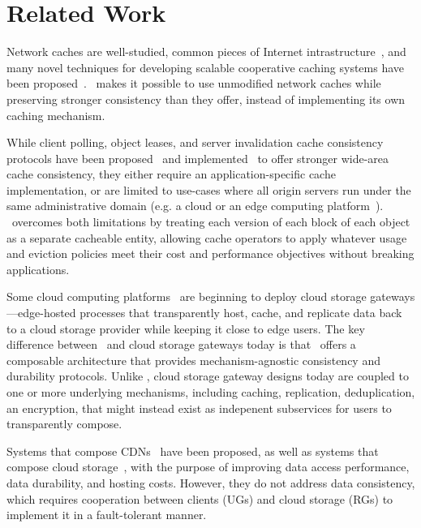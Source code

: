 \section{Related Work}
\label{sec:related}

Network caches are well-studied, common pieces of Internet intrastructure~\cite{wang99-survey,podlipnig03-survey,raunak99,Androutsellis-Theotokis04,shim99}, and many novel techniques for developing scalable cooperative caching systems have been proposed~\cite{sloppy-dht,karger99,cdn-redirect,Akamai,breslau99}.  \Syndicate\ makes it possible to use unmodified network caches while preserving stronger consistency than they offer, instead of implementing its own caching mechanism.

While client polling, object leases, and server invalidation cache consistency protocols have been proposed~\cite{wcdp,Gwertzman96,Liu97,gray89} and implemented~\cite{memcache,xFS,afs,shark} to offer stronger wide-area cache consistency, they either require an application-specific cache implementation, or are limited to use-cases where all origin servers run under the same administrative domain (e.g. a cloud or an edge computing platform~\cite{Akamai,PlanetLab}).  \Syndicate\ overcomes both limitations by treating each version of each block of each object as a separate cacheable entity, allowing cache operators to apply whatever usage and eviction policies meet their cost and performance objectives without breaking applications.

Some cloud computing platforms~\cite{riverbed-gateway,amazon-gateway,twinstrata-gateway} are beginning to deploy cloud storage gateways---edge-hosted processes that transparently host, cache, and replicate data back to a cloud storage provider while keeping it close to edge users.  The key difference between \Syndicate\ and cloud storage gateways today is that \Syndicate\ offers a composable architecture that provides mechanism-agnostic consistency and durability protocols.  Unlike \Syndicate, cloud storage gateway designs today are coupled to one or more underlying mechanisms, including caching, replication, deduplication, an encryption, that might instead exist as indepenent subservices for users to transparently compose.

Systems that compose CDNs~\cite{metacdn,cdn.net} have been proposed, as well as systems that compose cloud storage~\cite{metastorage}, with the purpose of improving data access performance, data durability, and hosting costs.  However, they do not address data consistency, which requires cooperation between clients (UGs) and cloud storage (RGs) to implement it in a fault-tolerant manner.

